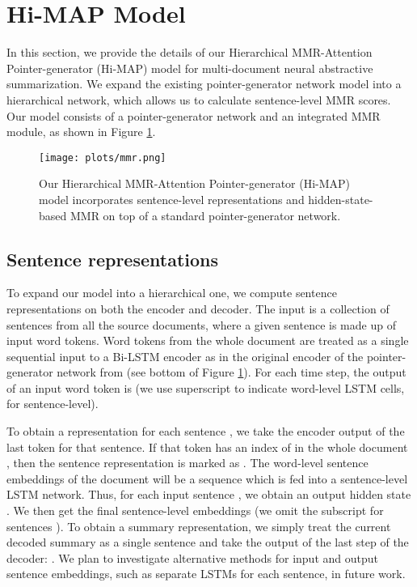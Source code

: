 \documentclass[11pt,a4paper]{article}
\begin{document}
\section{Hi-MAP Model}
In this section, we provide the details of our Hierarchical MMR-Attention Pointer-generator (Hi-MAP) model for  multi-document neural abstractive summarization. We expand the existing pointer-generator network model into a hierarchical network, which allows us to calculate sentence-level MMR scores. Our model consists of a pointer-generator network and an integrated MMR module, as shown in Figure \ref{fig:mmr}. 






\begin{figure}[t]
    \centering
    \texttt{[image: plots/mmr.png]}
    \caption{Our Hierarchical MMR-Attention Pointer-generator (Hi-MAP) model incorporates sentence-level representations and hidden-state-based MMR on top of a standard pointer-generator network.}
    \label{fig:mmr}
\end{figure} 



\subsection{Sentence representations}
To expand our model into a hierarchical one, we compute sentence representations on both the encoder and decoder. The input is a collection of sentences  from all the source documents, where a given sentence  is made up of input word tokens. Word tokens from the whole document are treated as a single sequential input to a Bi-LSTM encoder as in the original encoder of the pointer-generator network from  (see bottom of Figure \ref{fig:mmr}). For each time step, the output of an input word token  is  (we use superscript  to indicate word-level LSTM cells,  for sentence-level).


To obtain a representation for each sentence , we take the encoder output of the last token for that sentence. If that token has an index of  in the whole document , then the sentence representation is marked as . The word-level sentence embeddings of the document   will be a sequence which is fed into a sentence-level LSTM network. Thus, for each input sentence , we obtain an output hidden state . We then get the final sentence-level embeddings  (we omit the subscript for sentences ). To obtain a summary representation, we simply treat the current decoded summary as a single sentence and take the output of the last step of the decoder: . We plan to investigate alternative methods for input and output sentence embeddings, such as separate LSTMs for each sentence, in future work.
\end{document}

